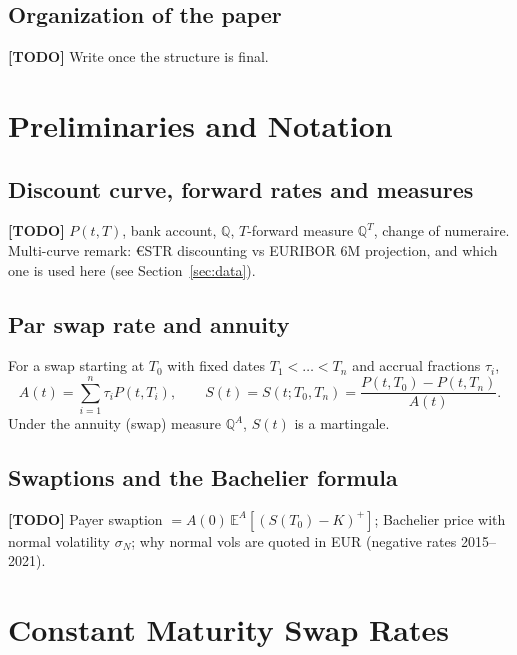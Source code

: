 \documentclass[11pt,a4paper]{article}
\theoremstyle{plain}
\theoremstyle{definition}
\newcommand{\E}{\mathbb{E}}
\newcommand{\Q}{\mathbb{Q}}
\newcommand{\todo}[1]{\textcolor{red!70!black}{\textbf{[TODO]} #1}}
\begin{document}
\subsection{Organization of the paper}
\todo{Write once the structure is final.}

\clearpage
\section{Preliminaries and Notation}
\label{sec:prelim}

\subsection{Discount curve, forward rates and measures}
\todo{$P(t,T)$, bank account, $\Q$, $T$-forward measure $\Q^T$, change of numeraire. Multi-curve remark: €STR discounting vs EURIBOR 6M projection, and which one is used here (see Section~\ref{sec:data}).}

\subsection{Par swap rate and annuity}
For a swap starting at $T_0$ with fixed dates $T_1<\dots<T_n$ and accrual fractions $\tau_i$,
\begin{equation}
    A(t) = \sum_{i=1}^{n}\tau_i P(t,T_i), \qquad
    S(t) = S(t;T_0,T_n) = \frac{P(t,T_0)-P(t,T_n)}{A(t)}.
    \label{eq:swap-rate}
\end{equation}
Under the annuity (swap) measure $\Q^A$, $S(t)$ is a martingale.

\subsection{Swaptions and the Bachelier formula}
\todo{Payer swaption $= A(0)\,\E^A[(S(T_0)-K)^+]$; Bachelier price with normal volatility $\sigma_N$; why normal vols are quoted in EUR (negative rates 2015--2021).}

\clearpage
\section{Constant Maturity Swap Rates}
\label{sec:cms}
\end{document}
